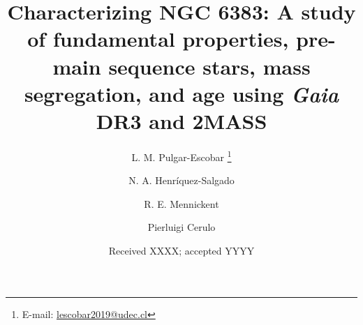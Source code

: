 \documentclass{aa}
\begin{document}
   \title{Characterizing NGC 6383: A study of fundamental properties, pre-main sequence stars, mass segregation, and age using \textit{Gaia} DR3 and 2MASS}

   \author{L. M. Pulgar-Escobar
          \thanks{E-mail: \href{mailto:lescobar2019@udec.cl}{lescobar2019@udec.cl}}
          \and
        N. A. Henríquez-Salgado
        \and 
        R. E. Mennickent
        \and
        Pierluigi Cerulo
          }


   \date{Received XXXX\@; accepted YYYY}
\end{document}
